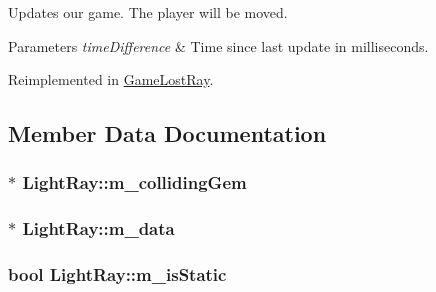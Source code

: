 Updates our game. The player will be moved. 


\begin{DoxyParams}{Parameters}
{\em time\+Difference} & Time since last update in milliseconds. \\
\hline
\end{DoxyParams}


Reimplemented in \hyperlink{class_game_lost_ray_a417d814372891fe7595a7e745b7a9f0f}{Game\+Lost\+Ray}.



\subsection{Member Data Documentation}
\hypertarget{class_light_ray_ac11396a5ac4a0899ca4bad5d88300fdd}{
\subsubsection[{m\+\_\+colliding\+Gem}]{$\ast$ Light\+Ray\+::m\+\_\+colliding\+Gem\hspace{0.3cm}{\ttfamily [protected]}}}\label{class_light_ray_ac11396a5ac4a0899ca4bad5d88300fdd}
\hypertarget{class_light_ray_acba0c9beeba8ea2863a022910d4ffc34}{
\subsubsection[{m\+\_\+data}]{$\ast$ Light\+Ray\+::m\+\_\+data\hspace{0.3cm}{\ttfamily [protected]}}}\label{class_light_ray_acba0c9beeba8ea2863a022910d4ffc34}
\hypertarget{class_light_ray_af44c254c7782710304489afdabd5303a}{
\subsubsection[{m\+\_\+is\+Static}]{\setlength{\rightskip}{0pt plus 5cm}bool Light\+Ray\+::m\+\_\+is\+Static\hspace{0.3cm}{\ttfamily [protected]}}}\label{class_light_ray_af44c254c7782710304489afdabd5303a}
